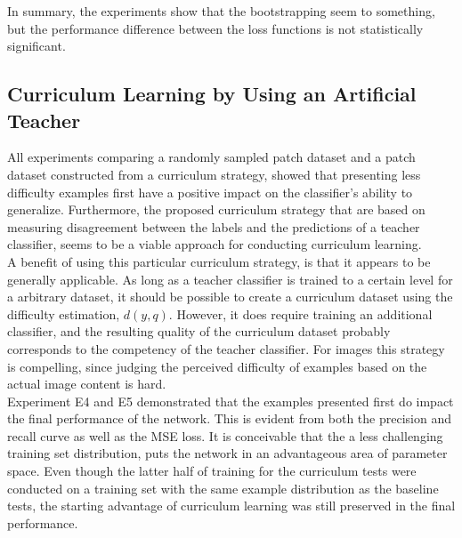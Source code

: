 In summary, the experiments show that the bootstrapping seem to something, but the performance difference between the loss functions is not statistically significant.\\


\subsection{Curriculum Learning by Using an Artificial Teacher}

All experiments comparing a randomly sampled patch dataset and a patch dataset constructed from a curriculum strategy, showed that presenting less difficulty examples first have a positive impact on the classifier's ability to generalize. Furthermore, the proposed curriculum strategy that are based on measuring disagreement between the labels and the predictions of a teacher classifier, seems to be a viable approach for conducting curriculum learning.\\

A benefit of using this particular curriculum strategy, is that it appears to be generally applicable. As long as a teacher classifier is trained to a certain level for a arbitrary dataset, it should be possible to create a curriculum dataset using the difficulty estimation, $d(y,q)$. However, it does require training an additional classifier, and the resulting quality of the curriculum dataset probably corresponds to the competency of the teacher classifier. For images this strategy is compelling, since judging the perceived difficulty of examples based on the actual image content is hard.\\

Experiment E4 and E5 demonstrated that the examples presented first do impact the final performance of the network. This is evident from both the precision and recall curve as well as the MSE loss. It is conceivable that the a less challenging training set distribution, puts the network in an advantageous area of parameter space. Even though the latter half of training for the curriculum tests were conducted on a training set with the same example distribution as the baseline tests, the starting advantage of curriculum learning was still preserved in the final performance.  \\

